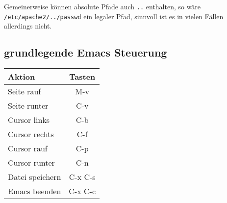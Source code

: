 \documentclass[12pt]{article}
\begin{document}
Gemeinerweise können absolute Pfade auch \texttt{..} enthalten, so wäre \\
\texttt{/etc/apache2/../passwd} ein legaler Pfad, sinnvoll ist es in vielen Fällen allerdings nicht.

\subsection{grundlegende Emacs Steuerung}

\begin{tabular}{lc}
Aktion & Tasten \\
\hline
Seite rauf & M-v \\
Seite runter & C-v \\
Cursor links & C-b \\
Cursor rechts & C-f \\
Cursor rauf & C-p \\
Cursor runter & C-n \\
Datei speichern & C-x C-s \\
Emacs beenden & C-x C-c \\
\end{tabular}
\end{document}
